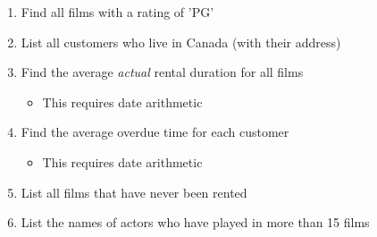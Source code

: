 \begin{exerciseboxcomputer}
\begin{enumerate}
  \item Find all films with a rating of 'PG'
  \item List all customers who live in Canada (with their address)
  \item Find the average \emph{actual} rental duration for all films
  \begin{itemize}
     \item This requires date arithmetic
  \end{itemize}
  \item Find the average overdue time for each customer
  \begin{itemize}
     \item This requires date arithmetic
  \end{itemize}
  \item List all films that have never been rented
  \item List the names of actors who have played in more than 15 films
\end{enumerate}
\end{exerciseboxcomputer}
